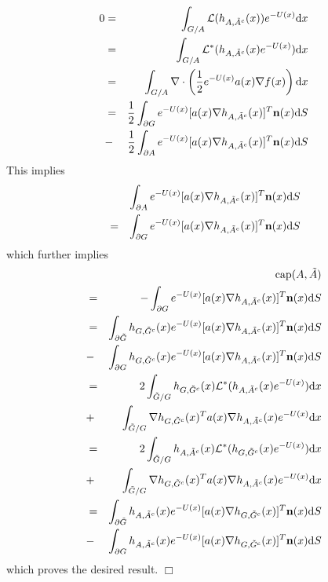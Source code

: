 \documentclass[english, aip, jcp, priprint, graphicx]{revtex4-1}
\newcommand{\mathd}{\mathrm{d}}
\newcommand{\tmop}[1]{\ensuremath{\operatorname{#1}}}
\theoremstyle{plain}
\theoremstyle{definition}
\theoremstyle{plain}
\begin{document}
\begin{eqnarray*}
0 & = & \int_{G / A} \mathcal{L} (h_{A, \tilde{A}^c} (x)) e^{- U (x)} \mathd
x\\
& = & \int_{G / A} \mathcal{L}^{\ast} (h_{A, \tilde{A}^c} (x) e^{- U (x)})
\mathd x\\
& = & \int_{G / A} \nabla \cdot \left( \frac{1}{2} e^{- U (x)} a (x) \nabla
f (x) \right) \mathd x\\
& = & \frac{1}{2} \int_{\partial G} e^{- U (x)} [a (x) \nabla h_{A,
\tilde{A}^c} (x)]^T {\textbf n} (x) \mathd S\\
& - & \frac{1}{2} \int_{\partial A} e^{- U (x)} [a (x) \nabla h_{A,
\tilde{A}^c} (x)]^T {\textbf n} (x) \mathd S\\
\end{eqnarray*}
This implies
\begin{eqnarray*}
&  & \int_{\partial A} e^{- U (x)} [a (x) \nabla h_{A,
\tilde{A}^c} (x)]^T {\textbf n} (x) \mathd S\\
& = & \int_{\partial G} e^{- U (x)} [a (x) \nabla h_{A, \tilde{A}^c} (x)]^T
{\textbf n} (x) \mathd S\\
\end{eqnarray*}
which further implies
\begin{eqnarray*}
&  & \tmop{cap} (A, \tilde{A})\\
& = & - \int_{\partial G} e^{- U (x)} [a (x) \nabla h_{A, \tilde{A}^c}
(x)]^T {\textbf n} (x) \mathd S\\
& = & \int_{\partial \tilde{G}} h_{G, \tilde{G}^c} (x) e^{- U (x)} [a (x)
\nabla h_{A, \tilde{A}^c} (x)]^T {\textbf n} (x) \mathd S\\
& - & \int_{\partial G} h_{G, \tilde{G}^c} (x) e^{- U (x)} [a (x) \nabla
h_{A, \tilde{A}^c} (x)]^T {\textbf n} (x) \mathd S\\
& = & 2 \int_{\tilde{G} / G} h_{G, \tilde{G}^c} (x) \mathcal{L}^{\ast}
(h_{A, \tilde{A}^c} (x) e^{- U (x)}) \mathd x\\
& + & \int_{\tilde{G} / G} \nabla h_{G, \tilde{G}^c} (x)^T a (x) \nabla
h_{A, \tilde{A}^c} (x) e^{- U (x)} \mathd x\\
& = & 2 \int_{\tilde{G} / G} h_{A, \tilde{A}^c} (x) \mathcal{L}^{\ast}
(h_{G, \tilde{G}^c} (x) e^{- U (x)}) \mathd x\\
& + & \int_{\tilde{G} / G} \nabla h_{G, \tilde{G}^c} (x)^T a (x) \nabla
h_{A, \tilde{A}^c} (x) e^{- U (x)} \mathd x\\
& = & \int_{\partial \tilde{G}} h_{A, \tilde{A}^c} (x) e^{- U (x)} [a (x)
\nabla h_{G, \tilde{G}^c} (x)]^T {\textbf n} (x) \mathd S\\
& - & \int_{\partial G} h_{A, \tilde{A}^c} (x) e^{- U (x)} [a (x) \nabla
h_{G, \tilde{G}^c} (x)]^T {\textbf n} (x) \mathd S
\end{eqnarray*}
which proves the desired result.
\hspace*{\fill}$\Box$\medskip
\end{document}
